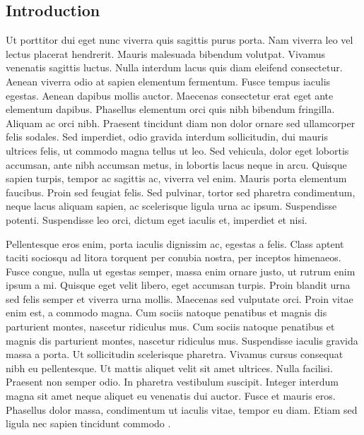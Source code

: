 \begin{refsection}
\section*{Introduction}
\label{sec:introduction-domain-specific}


Ut porttitor dui eget nunc viverra quis sagittis purus porta. Nam
viverra leo vel lectus placerat hendrerit. Mauris malesuada bibendum
volutpat. Vivamus venenatis sagittis luctus. Nulla interdum lacus quis
diam eleifend consectetur. Aenean viverra odio at sapien elementum
fermentum. Fusce tempus iaculis egestas. Aenean dapibus mollis
auctor. Maecenas consectetur erat eget ante elementum
dapibus. Phasellus elementum orci quis nibh bibendum
fringilla. Aliquam ac orci nibh. Praesent tincidunt diam non dolor
ornare sed ullamcorper felis sodales. Sed imperdiet, odio gravida
interdum sollicitudin, dui mauris ultrices felis, ut commodo magna
tellus ut leo. Sed vehicula, dolor eget lobortis accumsan, ante nibh
accumsan metus, in lobortis lacus neque in arcu. Quisque sapien
turpis, tempor ac sagittis ac, viverra vel enim. Mauris porta
elementum faucibus. Proin sed feugiat felis. Sed pulvinar, tortor sed
pharetra condimentum, neque lacus aliquam sapien, ac scelerisque
ligula urna ac ipsum. Suspendisse potenti. Suspendisse leo orci,
dictum eget iaculis et, imperdiet et nisi.

Pellentesque eros enim, porta iaculis dignissim ac, egestas a
felis. Class aptent taciti sociosqu ad litora torquent per conubia
nostra, per inceptos himenaeos. Fusce congue, nulla ut egestas semper,
massa enim ornare justo, ut rutrum enim ipsum a mi. Quisque eget velit
libero, eget accumsan turpis. Proin blandit urna sed felis semper et
viverra urna mollis. Maecenas sed vulputate orci. Proin vitae enim
est, a commodo magna. Cum sociis natoque penatibus et magnis dis
parturient montes, nascetur ridiculus mus. Cum sociis natoque
penatibus et magnis dis parturient montes, nascetur ridiculus
mus. Suspendisse iaculis gravida massa a porta. Ut sollicitudin
scelerisque pharetra. Vivamus cursus consequat nibh eu
pellentesque. Ut mattis aliquet velit sit amet ultrices. Nulla
facilisi. Praesent non semper odio. In pharetra vestibulum
suscipit. Integer interdum magna sit amet neque aliquet eu venenatis
dui auctor. Fusce et mauris eros. Phasellus dolor massa, condimentum
ut iaculis vitae, tempor eu diam. Etiam sed ligula nec sapien
tincidunt commodo \cite{Bader}.


\end{refsection}
